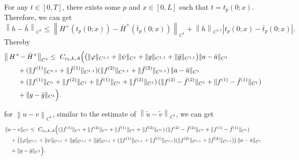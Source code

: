 \documentclass[a4paper,reqno,11pt]{amsart}
\numberwithin{equation}{section} %
\begin{document}
For any $t\in [0,T]$, there exists some $p$ and $x\in [0,L]$ such that $t=t_p(0;x)$. Therefore, we can get
$$
\left\| h-\bar{h} \right\| _{C^1}\le \left\| H^+\left( t_p(0;x) \right) -\bar{H}^+\left( \bar{t}_p(0;x) \right) \right\| _{C^1}+\left\| h \right\| _{C^{1,1}}\left| t_p(0;x)-\bar{t}_p(0;x) \right|.
$$
Thereby
\[
\begin{aligned}
&\bigl\|\,H^+\!-\bar H^+\!\,\bigr\|_{C^{1}}
\le{}\ C_{\varepsilon_0,k,A}\Bigl(
	\bigl(\|\varphi\|_{C^{1,1}}+\|\psi\|_{C^{1}}
     + \|g\|_{C^{1,1}}+\|\bar g\|_{C^{1,1}}\bigr)\|a-\bar a\|_{C^{1}}
 \\
&\qquad
     + (\|f^{(1)}\|_{C^{1,1}}+\|\bar f^{(1)}\|_{C^{1,1}})
       (\|f^{(2)}\|_{C^{1,1}}+\|\bar f^{(2)}\|_{C^{1,1}})\,
    \|a-\bar a\|_{C^{1}} \\
&\qquad
	 + (\|f^{(1)}\|_{C^{1}}+\|f^{(2)}\|_{C^{1}}
   +\|\bar f^{(1)}\|_{C^{1}}+\|\bar f^{(2)}\|_{C^{1}})\,
  (\|f^{(2)}-\bar f^{(2)}\|_{C^{1}}
   +\|f^{(1)}-\bar f^{(1)}\|_{C^{1}})\\
&\qquad
  + \|g-\bar g\|_{C^{1}}
\Bigr).
\end{aligned}
\]

for $\left\| u-v \right\| _{C^1}$, similar to the estimate of $\left\| \tilde{u}-\tilde{v} \right\| _{C^1}$, we can get
\[
\begin{aligned}
&\|u-v\|_{C^{1}}
\le{}\ C_{\varepsilon_0,k,A}\Bigl(
  (\|f^{(1)}\|_{C^{1}}+\|f^{(2)}\|_{C^{1}}
   +\|\bar f^{(1)}\|_{C^{1}}+\|\bar f^{(2)}\|_{C^{1}})\,
  (\|f^{(2)}-\bar f^{(2)}\|_{C^{1}}
   +\|f^{(1)}-\bar f^{(1)}\|_{C^{1}}) \\
&\quad + \bigl(\|\varphi\|_{C^{1,1}}+\|\psi\|_{C^{1,1}}
   + \|g\|_{C^{1,1}}+\|\bar g\|_{C^{1,1}}
   + (\|f^{(1)}\|_{C^{1,1}}+\|\bar f^{(1)}\|_{C^{1,1}})
     (\|f^{(2)}\|_{C^{1,1}}+\|\bar f^{(2)}\|_{C^{1,1}})\bigr)\,
   \|a-\bar a\|_{C^{1}} \\
&\quad + \|g-\bar g\|_{C^{1}}
\Bigr).
\end{aligned}
\]
\end{document}
